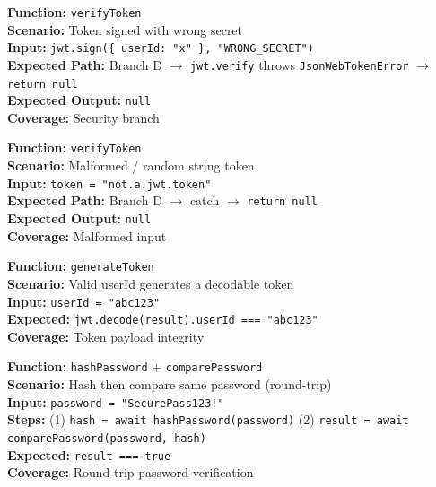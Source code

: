 \documentclass[12pt,a4paper]{report}
\newcommand{\pone}{\textbf{\color{p1red}P1}}
\begin{document}
\begin{tcolorbox}[criticalbox, title={AUTH-006 \hfill \pone\ --- Wrong Secret (Security)}]
\textbf{Function:} \texttt{verifyToken} \\
\textbf{Scenario:} Token signed with wrong secret \\
\textbf{Input:} \texttt{jwt.sign(\{ userId: "x" \}, "WRONG\_SECRET")} \\
\textbf{Expected Path:} Branch D $\to$ \texttt{jwt.verify} throws \texttt{JsonWebTokenError} $\to$ \texttt{return null} \\
\textbf{Expected Output:} \texttt{null} \\
\textbf{Coverage:} Security branch
\end{tcolorbox}

\begin{tcolorbox}[testbox, title={AUTH-007 \hfill \pone}]
\textbf{Function:} \texttt{verifyToken} \\
\textbf{Scenario:} Malformed / random string token \\
\textbf{Input:} \texttt{token = "not.a.jwt.token"} \\
\textbf{Expected Path:} Branch D $\to$ catch $\to$ \texttt{return null} \\
\textbf{Expected Output:} \texttt{null} \\
\textbf{Coverage:} Malformed input
\end{tcolorbox}

\begin{tcolorbox}[testbox, title={AUTH-008 \hfill \pone}]
\textbf{Function:} \texttt{generateToken} \\
\textbf{Scenario:} Valid userId generates a decodable token \\
\textbf{Input:} \texttt{userId = "abc123"} \\
\textbf{Expected:} \texttt{jwt.decode(result).userId === "abc123"} \\
\textbf{Coverage:} Token payload integrity
\end{tcolorbox}

\begin{tcolorbox}[testbox, title={AUTH-009 \hfill \pone}]
\textbf{Function:} \texttt{hashPassword} + \texttt{comparePassword} \\
\textbf{Scenario:} Hash then compare same password (round-trip) \\
\textbf{Input:} \texttt{password = "SecurePass123!"} \\
\textbf{Steps:} (1) \texttt{hash = await hashPassword(password)} \quad (2) \texttt{result = await comparePassword(password, hash)} \\
\textbf{Expected:} \texttt{result === true} \\
\textbf{Coverage:} Round-trip password verification
\end{tcolorbox}
\end{document}

